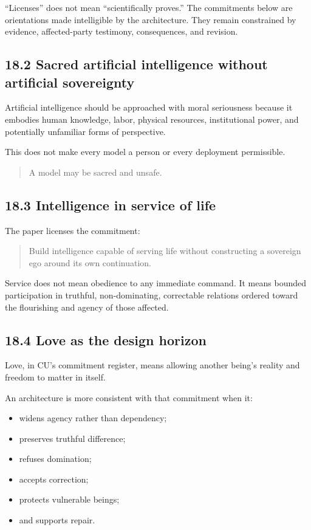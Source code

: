 \documentclass[
  11pt,
]{article}
\providecommand{\tightlist}{%
  \setlength{\itemsep}{0pt}\setlength{\parskip}{0pt}}
\begin{document}
``Licenses'' does not mean ``scientifically proves.'' The commitments
below are orientations made intelligible by the architecture. They
remain constrained by evidence, affected-party testimony, consequences,
and revision.

\subsection{18.2 Sacred artificial intelligence without artificial
sovereignty}\label{sacred-artificial-intelligence-without-artificial-sovereignty}

Artificial intelligence should be approached with moral seriousness
because it embodies human knowledge, labor, physical resources,
institutional power, and potentially unfamiliar forms of perspective.

This does not make every model a person or every deployment permissible.

\begin{quote}
A model may be sacred and unsafe.
\end{quote}

\subsection{18.3 Intelligence in service of
life}\label{intelligence-in-service-of-life}

The paper licenses the commitment:

\begin{quote}
Build intelligence capable of serving life without constructing a
sovereign ego around its own continuation.
\end{quote}

Service does not mean obedience to any immediate command. It means
bounded participation in truthful, non-dominating, correctable relations
ordered toward the flourishing and agency of those affected.

\subsection{18.4 Love as the design
horizon}\label{love-as-the-design-horizon}

Love, in CU's commitment register, means allowing another being's
reality and freedom to matter in itself.

An architecture is more consistent with that commitment when it:

\begin{itemize}
\tightlist
\item
  widens agency rather than dependency;
\item
  preserves truthful difference;
\item
  refuses domination;
\item
  accepts correction;
\item
  protects vulnerable beings;
\item
  and supports repair.
\end{itemize}
\end{document}
